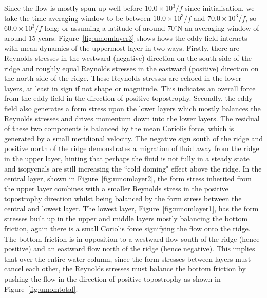 \documentclass[12pt,a4paper]{report}
\newcommand*\figref[1]{Figure~\ref{#1}}
\begin{document}
 Since the flow is mostly spun up well before $10.0\times10^{3}/f$ since initialisation, we take the time averaging window to be between $10.0\times10^{3}/f$ and $70.0\times10^{3}/f$, so $60.0\times10^{3}/f$ long; or assuming a latitude of around  $70^{\circ}\mathrm{N}$ an
 averaging window of around $15$ years. 
 \figref{fig:umomlayer3} shows hows the eddy field interacts with mean dynamics of the
 uppermost layer
 in two ways. Firstly, there are Reynolds stresses in the westward (negative) direction
 on the south side of the ridge and roughly equal Reynolds stresses in the eastward (positive) direction on the north side of the ridge. These Reynolds
 stresses are echoed in the lower layers, at least in sign if not shape or magnitude.
 This indicates an overall force from the eddy field in the direction of 
 positive topostrophy. Secondly, the eddy field also generates a form stress
 upon the lower layers which mostly balances the Reynolds stresses and drives
 momentum down into the lower layers. The residual of these two components is balanced
 by the mean Coriolis force, which is generated by a small meridional velocity.
 The negative sign south of the ridge and positive north of the ridge demonstrates
 a migration of fluid away from the ridge in the upper layer, hinting that perhaps
 the fluid is not fully in a steady state and isopycnals are still increasing the 
 ``cold doming" effect above the ridge. In the central layer, shown in
 \figref{fig:umomlayer2}, the form stress inherited
 from the upper layer combines with a smaller Reynolds stress in the positive topostrophy
 direction whilst being balanced by the form stress between the central and lowest layer.
 The lowest layer, \figref{fig:umomlayer1}, has the form stresses built up in the 
 upper and middle layers mostly balancing the bottom friction, again
 there is a small Coriolis force signifying the flow onto the ridge. The bottom friction is 
 in opposition to a westward flow south of the ridge (hence positive) and an eastward
 flow north of the ridge (hence negative). This implies that over the entire
 water column, since the form stresses between layers must cancel each other, the 
 Reynolds stresses must balance the bottom friction by pushing the flow in the direction 
 of positive topostrophy as shown in \figref{fig:umomtotal}. 
 
 
 
\end{document}
